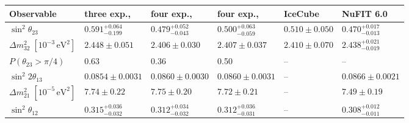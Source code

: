 \begin{tabular}{@{}llllll@{}}
  \toprule
  Observable & three exp., \mw{} & four exp., \mw{} & four exp., \mh{} & IceCube & NuFIT 6.0 \\
  \midrule
  \(\sin^2\theta_{23}\) & \(0.591^{+0.064}_{-0.199}\) & \(0.479^{+0.052}_{-0.043}\) & \(0.500^{+0.063}_{-0.059}\) & \(0.510 \pm 0.050\) & \(0.470^{+0.017}_{-0.013}\) \\
  \(\Delta m^2_{32}\;[10^{-3}\,\mathrm{eV}^2]\) & \(2.448 \pm 0.051\) & \(2.406 \pm 0.030\) & \(2.407 \pm 0.037\) & \(2.410 \pm 0.070\) & \(2.438^{+0.021}_{-0.019}\) \\
  \(P(\theta_{23} > \pi/4)\) & 0.63 & 0.36 & 0.50 & -- & -- \\
  \(\sin^2 2\theta_{13}\) & \(0.0854 \pm 0.0031\) & \(0.0860 \pm 0.0030\) & \(0.0860 \pm 0.0031\) & -- & \(0.0866 \pm 0.0021\) \\
  \(\Delta m^2_{21}\;[10^{-5}\,\mathrm{eV}^2]\) & \(7.74 \pm 0.22\) & \(7.75 \pm 0.20\) & \(7.72 \pm 0.21\) & -- & \(7.49 \pm 0.19\) \\
  \(\sin^2\theta_{12}\) & \(0.315^{+0.036}_{-0.032}\) & \(0.312^{+0.034}_{-0.032}\) & \(0.312^{+0.036}_{-0.031}\) & -- & \(0.308^{+0.012}_{-0.011}\) \\
  \bottomrule
\end{tabular}
